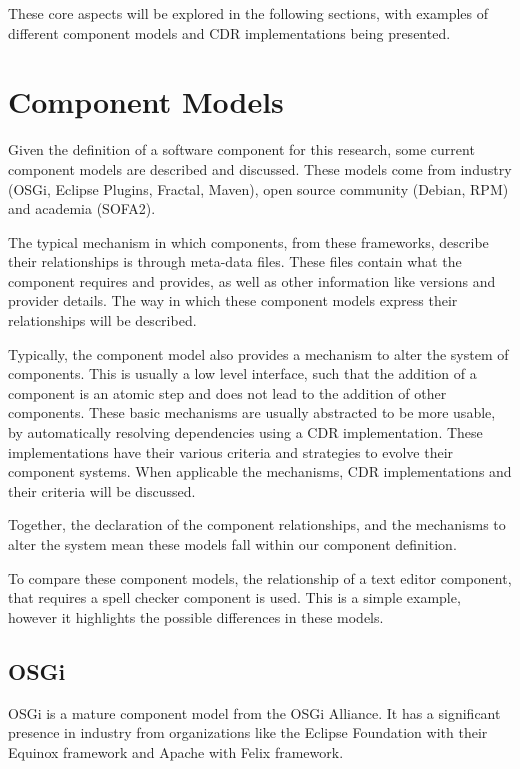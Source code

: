 These core aspects will be explored in the following sections, with examples of different component models and CDR implementations being presented.


\section{Component Models}
\label{background.models}
Given the definition of a software component for this research, some current component models are described and discussed.
These models come from industry (OSGi, Eclipse Plugins, Fractal, Maven), open source community (Debian, RPM) and academia (SOFA2).

The typical mechanism in which components, from these frameworks, describe their relationships is through meta-data files.
These files contain what the component requires and provides, as well as other information like versions and provider details.
The way in which these component models express their relationships will be described.

Typically, the component model also provides a mechanism to alter the system of components.
This is usually a low level interface, such that the addition of a component is an atomic step and does not lead to the addition of other components.
These basic mechanisms are usually abstracted to be more usable, by automatically resolving dependencies using a CDR implementation.
These implementations have their various criteria and strategies to evolve their component systems.
When applicable the mechanisms, CDR implementations and their criteria will be discussed.

Together, the declaration of the component relationships, and the mechanisms to alter the system mean these models fall within our component definition.

To compare these component models, the relationship of a text editor component, that requires a spell checker component is used.
This is a simple example, however it highlights the possible differences in these models.


\subsection{OSGi}
OSGi is a mature component model from the OSGi Alliance.
It has a significant presence in industry \cite{Kriens2008} from organizations like the Eclipse Foundation with their Equinox framework and Apache with Felix framework.

